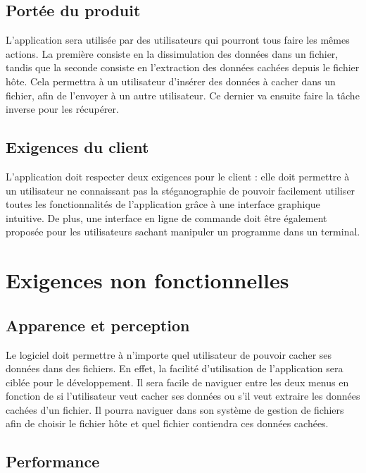\documentclass[11pt]{article}
\begin{document}
\subsection{Portée du produit}

L'application sera utilisée par des utilisateurs qui pourront tous faire les
mêmes actions. La première consiste en la dissimulation des données dans un
fichier, tandis que la seconde consiste en l'extraction des données cachées
depuis le fichier hôte. Cela permettra à un utilisateur d'insérer des données à
cacher dans un fichier, afin de l'envoyer à un autre utilisateur. Ce dernier va
ensuite faire la tâche inverse pour les récupérer.

\subsection{Exigences du client}

L'application doit respecter deux exigences pour le client : elle doit permettre
à un utilisateur ne connaissant pas la stéganographie de pouvoir facilement
utiliser toutes les fonctionnalités de l'application grâce à une interface
graphique intuitive. De plus, une interface en ligne de commande doit être
également proposée pour les utilisateurs sachant manipuler un programme dans un
terminal. 

\section{Exigences non fonctionnelles}

\subsection{Apparence et perception}

Le logiciel doit permettre à n'importe quel utilisateur de pouvoir cacher ses
données dans des fichiers. En effet, la facilité d'utilisation de l'application
sera ciblée pour le développement. Il sera facile de naviguer entre les deux
menus en fonction de si l'utilisateur veut cacher ses données ou s'il veut
extraire les données cachées d'un fichier. Il pourra naviguer dans son système
de gestion de fichiers afin de choisir le fichier hôte et quel fichier
contiendra ces données cachées. 

\subsection{Performance}
\end{document}
